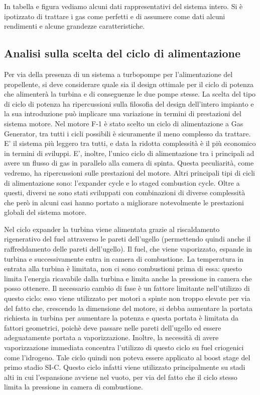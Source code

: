 In tabella e figura vediamo alcuni dati rappresentativi del sistema intero. Si è ipotizzato di trattare i gas come perfetti e di assumere come dati alcuni rendimenti e alcune grandezze caratteristiche.


\subsection{Analisi sulla scelta del ciclo di alimentazione}

Per via della presenza di un sistema a turbopompe per l'alimentazione del propellente, si deve considerare quale sia il design ottimale per il ciclo di potenza che alimenterà la turbina e di conseguenze le due pompe stesse. La scelta del tipo di ciclo di potenza ha ripercussioni sulla filosofia del design dell'intero impianto e la sua introduzione può implicare una variazione in termini di prestazioni del sistema motore. Nel motore F-1 è stato scelto un ciclo di alimentazione a Gas Generator, tra tutti i cicli possibili è sicuramente il meno complesso da trattare. E' il sistema più leggero tra tutti, e data la ridotta complessità è il più economico in termini di sviluppi. E', inoltre, l'unico ciclo di alimentazione tra i principali ad avere un flusso di gas in parallelo alla camera di spinta. Questa peculiarità, come vedremo, ha ripercussioni sulle prestazioni del motore. Altri principali tipi di cicli di alimentazione sono: l'expander cycle e lo staged combustion cycle. Oltre a questi, diversi ne sono stati sviluppati con combinazioni di diverse complessità che però in alcuni casi hanno portato a migliorare notevolmente le prestazioni globali del sistema motore.

Nel ciclo expander la turbina viene alimentata grazie al riscaldamento rigenerativo del fuel attraverso le pareti dell'ugello (permettendo quindi anche il raffreddamento delle pareti dell'ugello). Il fuel, che viene vaporizzato, espande in turbina e successivamente entra in camera di combustione. La temperatura in entrata alla turbina è limitata, non ci sono combustioni prima di essa: questo limita l'energia ricavabile dalla turbina e limita anche la pressione in camera che posso ottenere. 
Il necessario cambio di fase è un fattore limitante nell'utilizzo di questo ciclo: esso viene utilizzato per motori a spinte non troppo elevate per via del fatto che, crescendo la dimensione del motore, si debba aumentare la portata richiesta in turbina per aumentare la potenza e questa portata è limitata da fattori geometrici, poichè deve passare nelle pareti dell'ugello ed essere adeguatamente portata a vaporizzazione. Inoltre, la necessità di avere vaporizzazione immediata concentra l'utilizzo di questo ciclo su fuel criogenici come l'idrogeno. Tale ciclo quindi non poteva essere applicato al boost stage del primo stadio SI-C. Questo ciclo infatti viene utilizzato principalmente su stadi alti in cui l'espansione avviene nel vuoto, per via del fatto che il ciclo stesso limita la pressione in camera di combustione.

